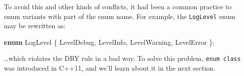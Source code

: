 \documentclass[
]{book}
\newenvironment{Shaded}{\begin{snugshade}}{\end{snugshade}}
\newcommand{\KeywordTok}[1]{\textcolor[rgb]{0.13,0.29,0.53}{\textbf{#1}}}
\newcommand{\NormalTok}[1]{#1}
\begin{document}
To avoid this and other kinds of conflicts, it had been a common practice to
enum variants with part of the enum name. For example, the \texttt{LogLevel} enum
may be rewritten as:

\begin{Shaded}
\begin{Highlighting}[]
\KeywordTok{enum}\NormalTok{ LogLevel}
\NormalTok{\{}
\NormalTok{    LevelDebug,}
\NormalTok{    LevelInfo,}
\NormalTok{    LevelWarning,}
\NormalTok{    LevelError}
\NormalTok{\};}
\end{Highlighting}
\end{Shaded}

\ldots which violates the DRY rule in a bad way. To solve this problem, \texttt{enum\ class} was introduced
in C++11, and we'll learn about it in the next section.

  
\end{document}
